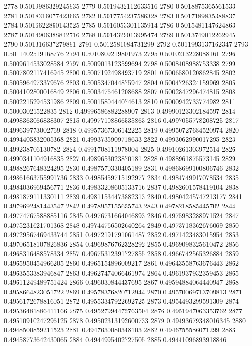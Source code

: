 2778 0.5019986329245935
2779 0.5019432112633516
2780 0.5018875365561533
2781 0.5018316077423665
2782 0.5017754237586328
2783 0.5017189835388837
2784 0.5016622860143525
2785 0.5016053301135914
2786 0.5015481147624863
2787 0.5014906388842716
2788 0.5014329013995474
2789 0.5013749012262945
2790 0.501316637279891
2791 0.5012581084731299
2792 0.5011993137162347
2793 0.5011402519168776
2794 0.5010809219801973
2795 0.5010213228088161
2796 0.5009614533028584
2797 0.5009013123599694
2798 0.5008408988753338
2799 0.5007802117416945
2800 0.5007192498493719
2801 0.5006580120862845
2802 0.5005964973379676
2803 0.5005347044875947
2804 0.5004726324159969
2805 0.5004102800016849
2806 0.5003476461208688
2807 0.5002847296474815
2808 0.5002215294531986
2809 0.5001580444074613
2810 0.5000942733774982
2811 0.50003021522835
2812 0.49996586882288907
2813 0.49990123302184597
2814 0.4998363066838307
2815 0.49977108866535863
2816 0.4997055778208725
2817 0.499639773002769
2818 0.49957367306142225
2819 0.49950727684520974
2820 0.4994405832005368
2821 0.4993735909718633
2822 0.4993062990017295
2823 0.499238706130782
2824 0.4991708111978004
2825 0.49910261303972514
2826 0.4990341104916835
2827 0.4989653023870181
2828 0.4988961875573145
2829 0.4988267648324295
2830 0.4987570330405189
2831 0.49868699100806746
2832 0.49861663755991736
2833 0.4985459715192977
2834 0.4984749917078534
2835 0.4984036969456771
2836 0.49833208605133716
2837 0.4982601578419104
2838 0.4981879111330111
2839 0.49811534473882313
2840 0.49804245747213177
2841 0.4979692481443547
2842 0.4978957155655743
2843 0.4978218585445702
2844 0.49774767588885116
2845 0.4976731664046893
2846 0.4975983288971524
2847 0.4975231621701368
2848 0.49744766502640264
2849 0.4973718362676069
2850 0.49729567469433744
2851 0.4972191791061487
2852 0.4971423483015954
2853 0.49706518107826836
2854 0.4969876762328292
2855 0.4969098325610472
2856 0.4968316488578334
2857 0.49675312391727855
2858 0.4966742565326884
2859 0.4965950454966205
2860 0.4965154896009217
2861 0.49643558763676443
2862 0.4963553383946847
2863 0.49627474066461974
2864 0.4961937932359453
2865 0.49611249489751424
2866 0.496030844437695
2867 0.49594884064440947
2868 0.4958664823051722
2869 0.49578376820712944
2870 0.49570069713709813
2871 0.4956172678816051
2872 0.49553347922692725
2873 0.4954493299591309
2874 0.49536481886411166
2875 0.49527994472763504
2876 0.4951947063353762
2877 0.49510910247296125
2878 0.49502313192600733
2879 0.49493679348016345
2880 0.4948500859211523
2881 0.4947630080348103
2882 0.4946755586071299
2883 0.49458773642430065
2884 0.4944995402727505
2885 0.49441096893918846
